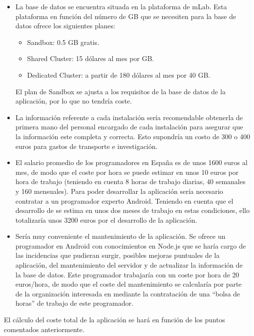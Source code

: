 \begin{itemize}
    \item La base de datos se encuentra situada en la plataforma de mLab. Esta plataforma en función del número de GB que se necesiten para la base de datos ofrece los siguientes planes:
    \begin{itemize}
        \item Sandbox: 0.5 GB gratis. 
        \item Shared Cluster: 15 dólares al mes por GB.
        \item Dedicated Cluster: a partir de 180 dólares al mes por 40 GB. 
    \end{itemize} 

    El plan de Sandbox se ajusta a los requisitos de la base de datos de la aplicación, por lo que no tendría coste. 
    
    \item La información referente a cada instalación sería recomendable obtenerla de primera mano del personal encargado de cada instalación para asegurar que la información este completa y correcta. Esto supondría un costo de 300 o 400 euros para gastos de transporte e investigación.
    \item  El salario promedio de los programadores en España es de unos 1600 euros al mes, de modo que el
		coste por hora se puede estimar en unos 10 euros por hora de trabajo (teniendo en cuenta 8 horas de
		trabajo diarias, 40 semanales y 160 mensuales).
		Para poder desarrollar la aplicación sería necesario contratar a un programador experto Android.
	Teniendo en cuenta que el desarrollo de \ULLAR{} se estima en unos dos meses de trabajo en estas
	condiciones, ello totalizaría unos 3200 euros por el desarrollo de la aplicación. 
    \item Sería muy conveniente el mantenimiento de la aplicación. 
		Se ofrece un programador en Android con conocimientos en Node.js que se haría cargo de las incidencias que pudieran surgir, posibles mejoras puntuales de la aplicación,
		del mantenimiento del servidor y de actualizar la información de la base de datos. 
		Este programador trabajaría con un coste por hora de 20 euros/hora, de modo que el coste del mantenimiento
		se calcularía por parte de la organización interesada en \ULLAR{} mediante la contratación de una ``bolsa
		de horas'' de trabajo de este programador.
\end{itemize}  

El cálculo del coste total de la aplicación se hará en función de los puntos comentados anteriormente.


